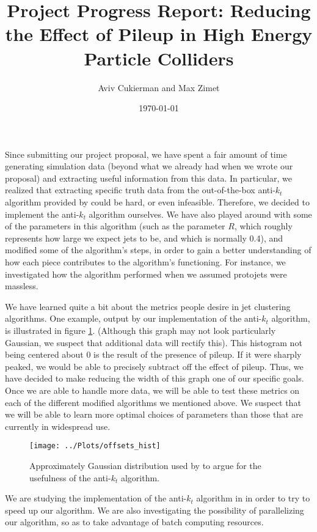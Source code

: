 \documentclass[12pt]{article}
\title{Project Progress Report: Reducing the Effect of Pileup in High Energy Particle Colliders}
\author{\large Aviv Cukierman and Max Zimet}
\date{\today}
\numberwithin{equation}{section}
\theoremstyle{definition}
\begin{document}
\maketitle

Since submitting our project proposal, we have spent a fair amount of time generating simulation data (beyond what we already had when we wrote our proposal) and extracting useful information from this data. In particular, we realized that extracting specific truth data from the out-of-the-box anti-$k_t$ algorithm provided by \cite{ref:cacciari2} could be hard, or even infeasible. Therefore, we decided to implement the anti-$k_t$ algorithm ourselves. We have also played around with some of the parameters in this algorithm (such as the parameter $R$, which roughly represents how large we expect jets to be, and which is normally 0.4), and modified some of the algorithm's steps, in order to gain a better understanding of how each piece contributes to the algorithm's functioning. For instance, we investigated how the algorithm performed when we assumed protojets were massless.

We have learned quite a bit about the metrics people desire in jet clustering algorithms. One example, output by our implementation of the anti-$k_t$ algorithm, is illustrated in figure \ref{fig:1}. (Although this graph may not look particularly Gaussian, we suspect that additional data will rectify this). This histogram not being centered about 0 is the result of the presence of pileup. If it were sharply peaked, we would be able to precisely subtract off the effect of pileup. Thus, we have decided to make reducing the width of this graph one of our specific goals. Once we are able to handle more data, we will be able to test these metrics on each of the different modified algorithms we mentioned above. We suspect that we will be able to learn more optimal choices of parameters than those that are currently in widespread use.
\begin{figure}[h!]
  \caption{Approximately Gaussian distribution used by \cite{ref:cacciari} to argue for the usefulness of the anti-$k_t$ algorithm.}\label{fig:1}
  \centering
    \texttt{[image: ../Plots/offsets\_hist]}
\end{figure}
We are studying the implementation of the anti-$k_t$ algorithm in \cite{ref:cacciari2} in order to try to speed up our algorithm. We are also investigating the possibility of parallelizing our algorithm, so as to take advantage of batch computing resources.
\end{document}
